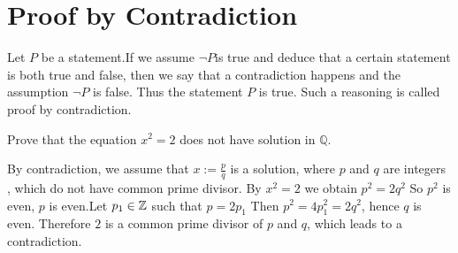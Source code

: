\section{Proof by Contradiction}
\begin{definitionenv}
    Let $P$ be a statement.If we assume $\neg P$is true and deduce that a certain statement is both true and false,  then we say that a contradiction happens and the assumption $\neg P$ is false. Thus the statement $P$ is true. Such a reasoning is called proof by contradiction.
\end{definitionenv}
\begin{exampleenv}
    Prove that the equation $x^2=2$ does not have solution in $\mathbb{Q}$.
\end{exampleenv}
    \begin{proofenv}
        By contradiction, we assume that $x:=\frac{p}{q}$ is a solution, where $p$ and $q$ are integers , which do not have common prime divisor. By $x^2=2$ we obtain $p^2=2q^2$
        So $p^2$ is even, $p$ is even.Let $p_1\in \mathbb{Z}$ such that $p=2p_1$
        Then $p^2=4p_1^2=2q^2$,  hence $q$ is even. Therefore $2$ is a common prime divisor of $p$ and $q$, which leads to a contradiction.
    \end{proofenv}



